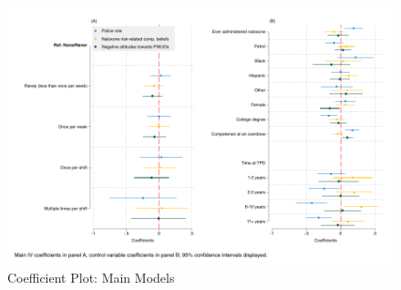 

\begin{landscape}
 
\end{landscape}


\begin{figure}
    \centering
    \caption{\centering Coefficient Plot: Main Models}
    \includegraphics{figures/coefplot-combined.pdf}
\end{figure}
